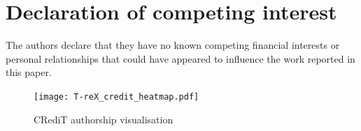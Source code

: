 \documentclass[a4paper,fleqn]{cas-dc}
\begin{document}
	\section*{Declaration of competing interest}
	The authors declare that they have no known competing financial interests or personal relationships that could have appeared to influence the work reported in this paper.
	
	\printcredits
	
	
	
	\begin{figure}[!htbp]
		\centering
		\texttt{[image: T-reX\_credit\_heatmap.pdf]}
		\caption{CRediT authorship visualisation}\label{fig:credit_heatmap}
	\end{figure} 
	
	
	
	
	
	
	
\end{document}
